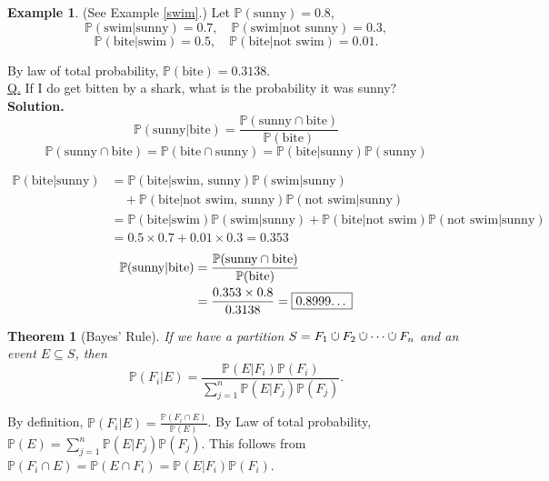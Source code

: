 \documentclass[a4paper,11pt]{amsbook}
\makeatletter
\renewenvironment{proof}[1][\proofname]{\par
    \pushQED{\qed}%
    \normalfont \topsep6\p@\@plus6\p@\relax
    \trivlist
    \itemindent\z@ %
    \item[\hskip\labelsep
          \scshape
      #1\@addpunct{.}]\ignorespaces
}{%
    \popQED\endtrivlist\@endpefalse
}
\newtheorem{theorem}{\hspace{-2em} \color{darkblue} Theorem}[chapter]
\theoremstyle{definition}
\newtheorem{example}{\hspace{-2em} \color{darkblue} Example}[chapter]
\theoremstyle{remark}
\renewcommand{\P}{\mathbb{P}}
\newcommand\inc\subseteq
\newcommand\0{\varnothing}
\newcommand\Disj
{
    \setbox0\hbox{$\cup$}
    \rlap{\hbox to \wd0{\hss\raisebox{3.5pt}{$\cdot$}\hss}}\box0
}
\newcommand\disj
{
    \mathbin{\mathchoice{\Disj}{\Disj}{\scalebox{0.5}{$\Disj$}}{\scalebox{0.4}{$\Disj$}}}
}
\makeatother
\begin{document}
    \begin{example} (See Example \ref{swim}.)
        Let $\P(\text{sunny})=0.8$,
        $$\P(\text{swim}|\text{sunny})=0.7,\quad\P(\text{swim}|\text{not sunny})=0.3,$$
        $$\P(\text{bite}|\text{swim})=0.5,\quad\P(\text{bite}|\text{not swim})=0.01.$$

        By law of total probability, $\P(\text{bite})=0.3138$.\\
        \underline{Q.} If I do get bitten by a shark, what is the probability it was sunny?\\
        \textbf{Solution.}
        $$\P(\text{sunny}|\text{bite})=\frac{\P(\text{sunny}\cap\text{bite})}{\P(\text{bite})}$$
        $$\P(\text{sunny}\cap\text{bite})=\P(\text{bite}\cap\text{sunny})=\P(\text{bite}|\text{sunny})\P(\text{sunny})$$
        \begin{center}
        \end{center}
        \begin{align*}
            \P(\text{bite}|\text{sunny})&=\P(\text{bite}|\text{swim, sunny})\P(\text{swim}|\text{sunny}) \\
            &\quad+\P(\text{bite}|\text{not swim, sunny})\P(\text{not swim}|\text{sunny}) \\
            &=\P(\text{bite}|\text{swim})\P(\text{swim}|\text{sunny})+\P(\text{bite}|\text{not swim})\P(\text{not swim}|\text{sunny}) \\
            &=0.5\times0.7+0.01\times0.3=0.353
        \end{align*}        
        \begin{align*}
            \P(\text{sunny}|\text{bite})&=\frac{\P(\text{sunny}\cap\text{bite})}{\P(\text{bite})} \\
            &=\frac{0.353\times0.8}{0.3138}=\fbox{0.8999\ldots}
        \end{align*}
    \end{example}

    \begin{theorem}[Bayes' Rule]{}
        If we have a partition $S=F_1\disj F_2\disj\cdots\disj F_n$ and an event $E\inc S$, then 
        $$\P(F_i|E)=\frac{\P(E|F_i)\P(F_i)}{\sum_{j=1}^n\P(E|F_j)\P(F_j)}.$$
    \end{theorem}
    \begin{proof}
        By definition, $\P(F_i|E)=\frac{\P(F_i\cap E)}{\P(E)}$.
        By Law of total probability, $\P(E)=\sum_{j=1}^n\P(E|F_j)\P(F_j)$.
        This follows from $\P(F_i\cap E)=\P(E\cap F_i)=\P(E|F_i)\P(F_i)$.
    \end{proof}
\end{document}
